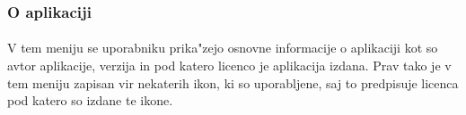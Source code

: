 \subsubsection{O aplikaciji}
\paragraph{}V tem meniju se uporabniku prika"zejo osnovne informacije o aplikaciji kot so avtor aplikacije, verzija in pod katero licenco\cite{license-wiki} je aplikacija izdana. Prav tako je v tem meniju zapisan vir nekaterih ikon, ki so uporabljene, saj to predpisuje licenca pod katero so izdane te ikone.
